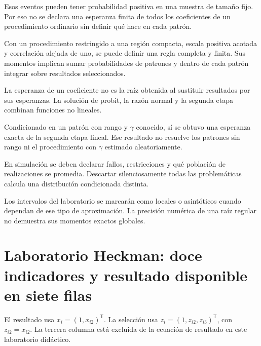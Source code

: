 \documentclass[11pt,a4paper]{article}
\newcommand{\T}{^{\mathsf T}}
\begin{document}
Esos eventos pueden tener
probabilidad positiva en
una muestra de tamaño fijo.
Por eso no se declara
una esperanza finita
de todos los coeficientes
de un procedimiento ordinario
sin definir qué hace
en cada patrón.

Con un procedimiento restringido
a una región compacta,
escala positiva acotada y
correlación alejada de uno,
se puede definir una
regla completa y finita.
Sus momentos implican
sumar probabilidades de
patrones y dentro de
cada patrón integrar
sobre resultados seleccionados.

La esperanza de un
coeficiente no es
la raíz obtenida al
sustituir resultados por
sus esperanzas.
La solución de probit,
la razón normal y
la segunda etapa
combinan funciones no lineales.

\begin{ejemplo}
Condicionado en un patrón
con rango y \(\gamma\) conocido,
sí se obtuvo una
esperanza exacta de
la segunda etapa lineal.
Ese resultado no
resuelve los patrones
sin rango ni el
procedimiento con \(\gamma\)
estimado aleatoriamente.
\end{ejemplo}
En simulación se deben
declarar fallos, restricciones
y qué población de
realizaciones se promedia.
Descartar silenciosamente
todas las problemáticas
calcula una distribución
condicionada distinta.

Los intervalos del laboratorio
se marcarán como locales
o asintóticos cuando
dependan de ese tipo
de aproximación.
La precisión numérica
de una raíz regular
no demuestra sus
momentos exactos globales.

\clearpage
\section{Laboratorio Heckman: doce indicadores y resultado disponible en siete filas}\label{unidad154}
El resultado usa \(x_i=(1,x_{i2})\T\).
La selección usa
\(z_i=(1,z_{i2},z_{i3})\T\),
con \(z_{i2}=x_{i2}\).
La tercera columna está
excluida de la ecuación de resultado
en este laboratorio didáctico.
\end{document}
